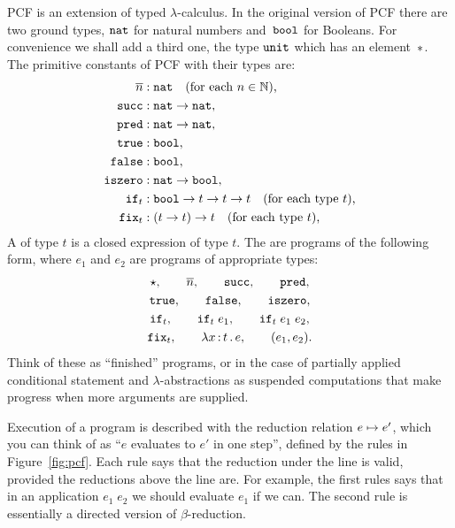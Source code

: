 PCF is an extension of typed $\lambda$-calculus. In the original version
of PCF there are two ground types, $\mathtt{nat}$ for natural numbers
and~$\mathtt{bool}$ for Booleans. For convenience we shall add a third one,
the type $\mathtt{unit}$ which has an element~${*}$. The primitive constants
of PCF with their types are:
%
\begin{align*}
  \overline{n} &: \mathtt{nat} \quad \text{(for each $n \in \mathbb{N}$),} \\
  \mathtt{succ} &: \mathtt{nat} \to \mathtt{nat}, \\
  \mathtt{pred} &: \mathtt{nat} \to \mathtt{nat}, \\
  \mathtt{true} &: \mathtt{bool}, \\
  \mathtt{false} &: \mathtt{bool}, \\
  \mathtt{iszero} &: \mathtt{nat} \to \mathtt{bool}, \\
  \mathtt{if}_t &: \mathtt{bool} \to t \to t \to t \quad\text{(for each type $t$),}\\
  \mathtt{fix}_t &: (t \to t) \to t \quad\text{(for each type $t$),}
\end{align*}
%
A  of type $t$ is a closed expression of type $t$. The
 are programs of the following form, where $e_1$ and
$e_2$ are programs of appropriate types:
%
\begin{gather*}
  \star,\qquad \overline{n},\qquad \mathtt{succ},\qquad \mathtt{pred},\\
  \mathtt{true},\qquad \mathtt{false},\qquad \mathtt{iszero},\\
  \mathtt{if}_t,\qquad \mathtt{if}_t \; e_1,\qquad \mathtt{if}_t \; e_1\; e_2,\\
  \mathtt{fix}_t,\qquad \lambda x \,{:}\, t\,.\,e,\qquad (e_1, e_2).
\end{gather*}
%
Think of these as ``finished'' programs, or in the case of partially
applied conditional statement and $\lambda$-abstractions as suspended
computations that make progress when more arguments are supplied.

Execution of a program is described with the reduction relation $e
\mapsto e'$, which you can think of as ``$e$ evaluates to $e'$ in one
step'', defined by the rules in Figure~\ref{fig:pcf}. Each rule says
that the reduction under the line is valid, provided the reductions
above the line are. For example, the first rules says that in an
application $e_1\;e_2$ we should evaluate $e_1$ if we can. The second
rule is essentially a directed version of $\beta$-reduction.

